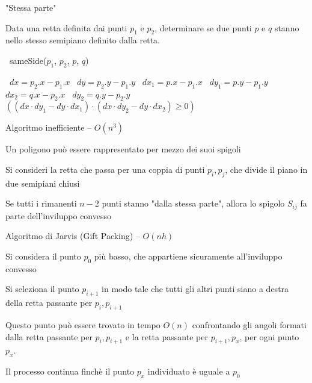 \begin{frame}{"Stessa parte"}

\vspace{-9pt}
\begin{myboxtitle}[Problema]
Data una retta definita dai punti $p_1$ e $p_2$, determinare se due punti $p$ e $q$ 
stanno nello stesso semipiano definito dalla retta.
\end{myboxtitle}

\medskip
\begin{Procedure}
\caption[A]{\BOOLEAN\ \textsf{sameSide}(\Point $p_1$, \Point $p_2$, \Point $p$, \Point $q$)}
\REAL\ $dx = p_2.x - p_1.x$\;
\REAL\ $dy = p_2.y - p_1.y$\;
\REAL\ $dx_1 = p.x - p_1.x$\;
\REAL\ $dy_1 = p.y - p_1.y$\;
\REAL\ $dx_2 = q.x - p_2.x$\;
\REAL\ $dy_2 = q.y - p_2.y$\;
\Return $((dx \cdot dy_1 - dy \cdot dx_1) \cdot (dx \cdot dy_2 - dy \cdot dx_2) \ge 0)$\;
\end{Procedure}

\end{frame}


\begin{frame}{Algoritmo inefficiente -- $O(n^3)$}

\BIL
\item Un poligono può essere rappresentato per mezzo dei suoi spigoli
\item Si consideri la retta che passa per una coppia di punti $p_i,p_j$, che divide il piano in due semipiani chiusi
\item Se tutti i rimanenti $n-2$ punti stanno "dalla stessa parte", allora lo
spigolo $S_{ij}$ fa parte dell’inviluppo convesso
\EIL
{}

\end{frame}


\begin{frame}{Algoritmo di Jarvis (Gift Packing) -- $O(nh)$}

\BIL
\item Si considera il punto $p_0$ più basso, che appartiene sicuramente all'inviluppo convesso
\item Si seleziona il punto $p_{i+1}$ in modo tale che tutti gli altri punti siano a destra della retta passante per $p_i, p_{i+1}$
\item Questo punto può essere trovato in tempo $O(n)$ confrontando gli angoli formati dalla retta passante per $p_i, p_{i+1}$ e la retta passante per
$p_{i+1}, p_x$, per ogni punto $p_x$.
\item Il processo continua finchè il punto $p_x$ individuato è uguale a $p_0$
\EIL
{}

\end{frame}





